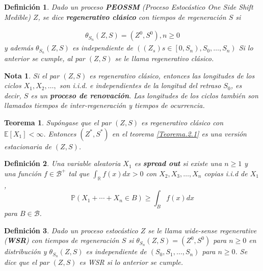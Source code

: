 \documentclass{article}
\newtheorem{Def}{Definición}[section]
\newtheorem{Teo}{Teorema}[section]
\newtheorem{Note}{Nota}[section]
\newcommand{\rea}{\mathbb{R}}
\newcommand{\esp}{\mathbb{E}}
\newcommand{\prob}{\mathbb{P}}
\numberwithin{equation}{section}
\begin{document}
\begin{Def}
Dado un proceso \textbf{PEOSSM} (Proceso Estoc\'astico One Side Shift Medible) $Z$, se dice \textbf{regenerativo cl\'asico} con tiempos de regeneraci\'on $S$ si 

\begin{eqnarray*}
\theta_{S_{n}}\left(Z,S\right)=\left(Z^{0},S^{0}\right),n\geq0
\end{eqnarray*}
y adem\'as $\theta_{S_{n}}\left(Z,S\right)$ es independiente de $\left(\left(Z_{s}\right)s\in\left[0,S_{n}\right),S_{0},\ldots,S_{n}\right)$
Si lo anterior se cumple, al par $\left(Z,S\right)$ se le llama regenerativo cl\'asico.
\end{Def}

\begin{Note}
Si el par $\left(Z,S\right)$ es regenerativo cl\'asico, entonces las longitudes de los ciclos $X_{1},X_{2},\ldots,$ son i.i.d. e independientes de la longitud del retraso $S_{0}$, es decir, $S$ es un \textbf{proceso de renovaci\'on}. Las longitudes de los ciclos tambi\'en son llamados tiempos de inter-regeneraci\'on y tiempos de ocurrencia.

\end{Note}

\begin{Teo}\label{Teo.3.1}
Sup\'ongase que el par $\left(Z,S\right)$ es regenerativo cl\'asico con $\esp\left[X_{1}\right]<\infty$. Entonces $\left(Z^{*},S^{*}\right)$ en el teorema \ref{Teorema.2.1} es una versi\'on estacionaria de $\left(Z,S\right)$.
\end{Teo}


\begin{Def}
Una variable aleatoria $X_{1}$ es \textbf{spread out} si existe una $n\geq1$ y una  funci\'on $f\in\mathcal{B}^{+}$ tal que $\int_{\rea}f\left(x\right)dx>0$ con $X_{2},X_{3},\ldots,X_{n}$ copias i.i.d  de $X_{1}$, $$\prob\left(X_{1}+\cdots+X_{n}\in B\right)\geq\int_{B}f\left(x\right)dx$$ para $B\in\mathcal{B}$.
\end{Def}

\begin{Def}
Dado un proceso estoc\'astico $Z$ se le llama \textit{wide-sense regenerative} (\textbf{WSR}) con tiempos de regeneraci\'on $S$ si $\theta_{S_{n}}\left(Z,S\right)=\left(Z^{0},S^{0}\right)$ para $n\geq0$ en distribuci\'on y $\theta_{S_{n}}\left(Z,S\right)$ es independiente de $\left(S_{0},S_{1},\ldots,S_{n}\right)$ para $n\geq0$.
Se dice que el par $\left(Z,S\right)$ es WSR si lo anterior se cumple.
\end{Def}
\end{document}

